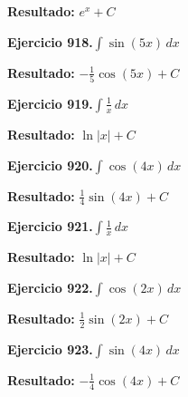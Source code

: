 \documentclass[10pt,a4paper]{article}
\begin{document}
\begin{solbox}
\textbf{Resultado:} \(\displaystyle e^x + C\)
\end{solbox}

\begin{ejbox}
\textbf{Ejercicio 918.}\quad $\int \sin(5x)\,dx$
\end{ejbox}

\begin{solbox}
\textbf{Resultado:} \(\displaystyle -\frac{1}{5}\cos(5x) + C\)
\end{solbox}

\newpage
\begin{ejbox}
\textbf{Ejercicio 919.}\quad $\int \frac{1}{x}\,dx$
\end{ejbox}

\begin{solbox}
\textbf{Resultado:} \(\displaystyle \ln|x| + C\)
\end{solbox}

\begin{ejbox}
\textbf{Ejercicio 920.}\quad $\int \cos(4x)\,dx$
\end{ejbox}

\begin{solbox}
\textbf{Resultado:} \(\displaystyle \frac{1}{4}\sin(4x) + C\)
\end{solbox}

\begin{ejbox}
\textbf{Ejercicio 921.}\quad $\int \frac{1}{x}\,dx$
\end{ejbox}

\begin{solbox}
\textbf{Resultado:} \(\displaystyle \ln|x| + C\)
\end{solbox}

\newpage
\begin{ejbox}
\textbf{Ejercicio 922.}\quad $\int \cos(2x)\,dx$
\end{ejbox}

\begin{solbox}
\textbf{Resultado:} \(\displaystyle \frac{1}{2}\sin(2x) + C\)
\end{solbox}

\begin{ejbox}
\textbf{Ejercicio 923.}\quad $\int \sin(4x)\,dx$
\end{ejbox}

\begin{solbox}
\textbf{Resultado:} \(\displaystyle -\frac{1}{4}\cos(4x) + C\)
\end{solbox}
\end{document}

